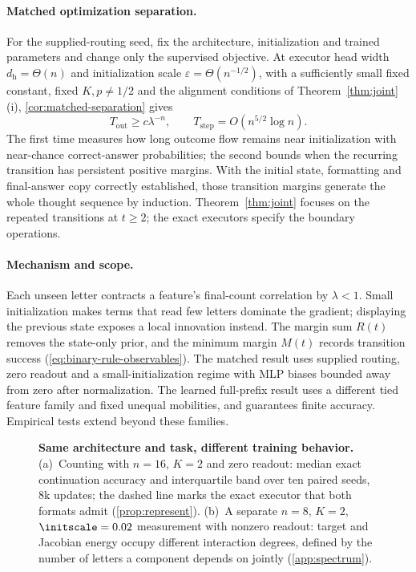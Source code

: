 \paragraph{Matched optimization separation.}
For the supplied-routing seed, fix the architecture, initialization and trained parameters
and change only the supervised objective. At executor head width $d_{\mathrm h}=\Theta(n)$
and initialization scale $\varepsilon=\Theta(n^{-1/2})$, with a sufficiently small fixed
constant, fixed $K,p\ne1/2$ and the alignment conditions of Theorem~\ref{thm:joint}(i), \cref{cor:matched-separation} gives
\[
 T_{\mathrm{out}}\ge c\lambda^{-n},\qquad
 T_{\mathrm{step}}=O(n^{5/2}\log n).
\]
The first time measures how long outcome flow remains near initialization with
near-chance correct-answer probabilities;
the second bounds when the recurring transition has persistent positive margins.
With the initial state, formatting and final-answer copy correctly established, those
transition margins generate the whole thought sequence by induction. Theorem~\ref{thm:joint}
focuses on the repeated transitions at $t\ge2$; the exact executors specify the boundary operations.

\paragraph{Mechanism and scope.}
Each unseen letter contracts a feature's final-count correlation by $\lambda<1$.
Small initialization makes terms that read few letters dominate the gradient; displaying
the previous state exposes a local innovation instead. The margin sum $R(t)$ removes the
state-only prior, and the minimum margin $M(t)$ records transition success
(\cref{eq:binary-rule-observables}). The matched result uses supplied routing, zero readout
and a small-initialization regime with MLP biases bounded away from zero after normalization.
The learned full-prefix result uses a different tied feature family and fixed unequal
mobilities, and guarantees finite accuracy. Empirical tests extend beyond these families.

\begin{figure}[t]
\centering

\caption{\textbf{Same architecture and task, different training behavior.}
(a)~Counting with $n=16$, $K=2$ and zero readout: median exact continuation accuracy and interquartile band over ten paired seeds, $8$k
updates; the dashed line marks the exact executor that both formats admit (\cref{prop:represent}).
(b)~A separate $n=8$, $K=2$, $\initscale=0.02$ measurement with nonzero readout: target and Jacobian energy occupy different interaction degrees, defined by the number of letters a component depends on jointly (\cref{app:spectrum}).}
\label{fig:overview}
\end{figure}

